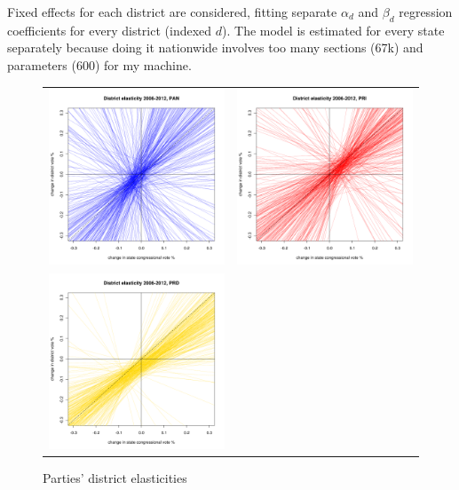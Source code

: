 \documentclass[letter,12pt]{article}
\begin{document}
\noindent Fixed effects for each district are considered, fitting separate $\alpha_d$ and $\beta_d$ regression coefficients for every district (indexed $d$). The model is estimated for every state separately because doing it nationwide involves too many sections (67k) and parameters (600) for my machine. 

\begin{figure}
\begin{center}
  \begin{tabular}{cc}
    \includegraphics[width=.4\columnwidth]{../graphs/elastpand0.pdf} & \includegraphics[width=.4\columnwidth]{../graphs/elastprid0.pdf} \\
    \includegraphics[width=.4\columnwidth]{../graphs/elastprdd0.pdf} &  \\
  \end{tabular}
  \caption{Parties' district elasticities}\label{F:malmgnat}
\end{center}
\end{figure}
\end{document}
